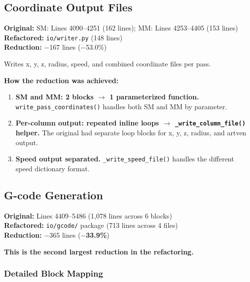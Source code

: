 \documentclass[11pt,letterpaper]{article}
\newcommand{\code}[1]{\texttt{#1}}
\begin{document}
\subsection{Coordinate Output Files}

\textbf{Original:} SM: Lines 4090--4251 (162 lines); MM: Lines 4253--4405 (153 lines)\\
\textbf{Refactored:} \code{io/writer.py} (148 lines)\\
\textbf{Reduction:} $-$167 lines ($-$53.0\%)

Writes x, y, z, radius, speed, and combined coordinate files per pass.

\textbf{How the reduction was achieved:}

\begin{enumerate}
    \item \textbf{SM and MM: 2 blocks $\to$ 1 parameterized function.} \code{write\_pass\_coordinates()} handles both SM and MM by parameter.

    \item \textbf{Per-column output: repeated inline loops $\to$ \code{\_write\_column\_file()} helper.} The original had separate loop blocks for x, y, z, radius, and artven output.

    \item \textbf{Speed output separated.} \code{\_write\_speed\_file()} handles the different speed dictionary format.
\end{enumerate}

\subsection{G-code Generation}

\textbf{Original:} Lines 4409--5486 (1,078 lines across 6 blocks)\\
\textbf{Refactored:} \code{io/gcode/} package (713 lines across 4 files)\\
\textbf{Reduction:} $-$365 lines (\textbf{$-$33.9\%})

\textbf{This is the second largest reduction in the refactoring.}

\subsubsection{Detailed Block Mapping}
\end{document}
